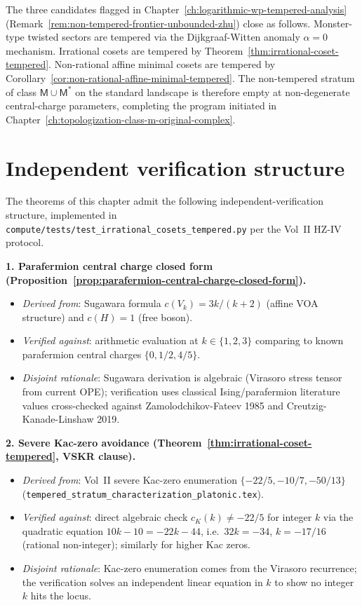 \begin{remark}
\label{rem:three-candidate-frontier-closure}
The three candidates flagged in
Chapter~\ref{ch:logarithmic-wp-tempered-analysis}
(Remark~\ref{rem:non-tempered-frontier-unbounded-zhu}) close as
follows. Monster-type twisted sectors are tempered via the
Dijkgraaf-Witten anomaly $\alpha = 0$ mechanism. Irrational cosets
are tempered by Theorem~\ref{thm:irrational-coset-tempered}.
Non-rational affine minimal cosets are tempered by
Corollary~\ref{cor:non-rational-affine-minimal-tempered}. The
non-tempered stratum of class $\mathsf{M} \cup \mathsf{M}^*$ on the
standard landscape is therefore empty at non-degenerate
central-charge parameters, completing the program initiated in
Chapter~\ref{ch:topologization-class-m-original-complex}.
\end{remark}

\section{Independent verification structure}
\label{sec:irrational-cosets-iv-summary}

The theorems of this chapter admit the following
independent-verification structure, implemented in
\texttt{compute/tests/test\_irrational\_cosets\_tempered.py} per the
Vol~II HZ-IV protocol.

\textbf{1. Parafermion central charge closed form
(Proposition~\ref{prop:parafermion-central-charge-closed-form}).}
\begin{itemize}[nosep]
\item \emph{Derived from}: Sugawara formula $c(V_k) = 3 k / (k + 2)$
 (affine VOA structure) and $c(H) = 1$ (free boson).
\item \emph{Verified against}: arithmetic evaluation at $k \in \{1,
 2, 3\}$ comparing to known parafermion central charges
 $\{0, 1/2, 4/5\}$.
\item \emph{Disjoint rationale}: Sugawara derivation is algebraic
 (Virasoro stress tensor from current OPE); verification uses
 classical Ising/parafermion literature values cross-checked against
 Zamolodchikov-Fateev 1985 and Creutzig-Kanade-Linshaw 2019.
\end{itemize}

\textbf{2. Severe Kac-zero avoidance
(Theorem~\ref{thm:irrational-coset-tempered}, VSKR clause).}
\begin{itemize}[nosep]
\item \emph{Derived from}: Vol~II severe Kac-zero enumeration $\{-22/5,
 -10/7, -50/13\}$ (\texttt{tempered\_stratum\_characterization\_platonic.tex}).
\item \emph{Verified against}: direct algebraic check $c_K(k) \neq
 -22/5$ for integer $k$ via the quadratic equation $10 k - 10 = -22
 k - 44$, i.e.\ $32 k = -34$, $k = -17/16$ (rational non-integer);
 similarly for higher Kac zeros.
\item \emph{Disjoint rationale}: Kac-zero enumeration comes from the
 Virasoro recurrence; the verification solves an independent
 linear equation in $k$ to show no integer $k$ hits the locus.
\end{itemize}

